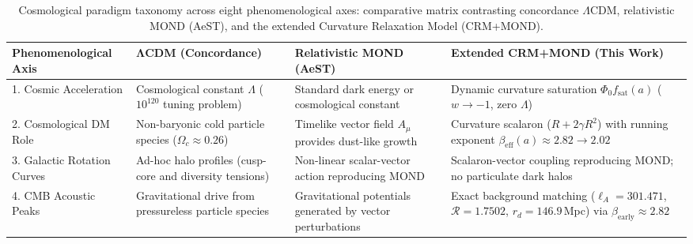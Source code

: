 \documentclass[aps,prd,twocolumn,superscriptaddress,nofootinbib,floatfix]{revtex4-2}
\begin{document}
\begin{table}[t]
\centering
\caption{Cosmological paradigm taxonomy across eight phenomenological axes: comparative matrix contrasting concordance $\Lambda$CDM, relativistic MOND (AeST), and the extended Curvature Relaxation Model (CRM+MOND).}
\label{tab:cosmological_taxonomy}
\footnotesize
\begin{tabular}{@{}llll@{}}
\toprule
\parbox[t]{0.17\textwidth}{\raggedright \textbf{Phenomenological Axis}} &
\parbox[t]{0.25\textwidth}{\raggedright $\mathbf{\Lambda}$\textbf{CDM (Concordance)}} &
\parbox[t]{0.26\textwidth}{\raggedright \textbf{Relativistic MOND (AeST)}} &
\parbox[t]{0.26\textwidth}{\raggedright \textbf{Extended CRM+MOND (This Work)}} \\
\midrule
\parbox[t]{0.17\textwidth}{\raggedright 1. Cosmic Acceleration} &
\parbox[t]{0.25\textwidth}{\raggedright Cosmological constant $\Lambda$ ($10^{120}$ tuning problem)} &
\parbox[t]{0.26\textwidth}{\raggedright Standard dark energy or cosmological constant} &
\parbox[t]{0.26\textwidth}{\raggedright Dynamic curvature saturation $\Phi_0 f_{\mathrm{sat}}(a)$ ($w \to -1$, zero $\Lambda$)} \\
\addlinespace
\parbox[t]{0.17\textwidth}{\raggedright 2. Cosmological DM Role} &
\parbox[t]{0.25\textwidth}{\raggedright Non-baryonic cold particle species ($\Omega_c \approx 0.26$)} &
\parbox[t]{0.26\textwidth}{\raggedright Timelike vector field $A_\mu$ provides dust-like growth} &
\parbox[t]{0.26\textwidth}{\raggedright Curvature scalaron ($R+2\gamma R^2$) with running exponent $\beta_{\mathrm{eff}}(a) \approx 2.82 \to 2.02$} \\
\addlinespace
\parbox[t]{0.17\textwidth}{\raggedright 3. Galactic Rotation Curves} &
\parbox[t]{0.25\textwidth}{\raggedright Ad-hoc halo profiles (cusp-core and diversity tensions)} &
\parbox[t]{0.26\textwidth}{\raggedright Non-linear scalar-vector action reproducing MOND} &
\parbox[t]{0.26\textwidth}{\raggedright Scalaron-vector coupling reproducing MOND; no particulate dark halos} \\
\addlinespace
\parbox[t]{0.17\textwidth}{\raggedright 4. CMB Acoustic Peaks} &
\parbox[t]{0.25\textwidth}{\raggedright Gravitational drive from pressureless particle species} &
\parbox[t]{0.26\textwidth}{\raggedright Gravitational potentials generated by vector perturbations} &
\parbox[t]{0.26\textwidth}{\raggedright Exact background matching ($\ell_A = 301.471$, $\mathcal{R} = 1.7502$, $r_d = 146.9$\,Mpc) via $\beta_{\mathrm{early}} \approx 2.82$} \\

\end{tabular}
\end{table}
\end{document}

